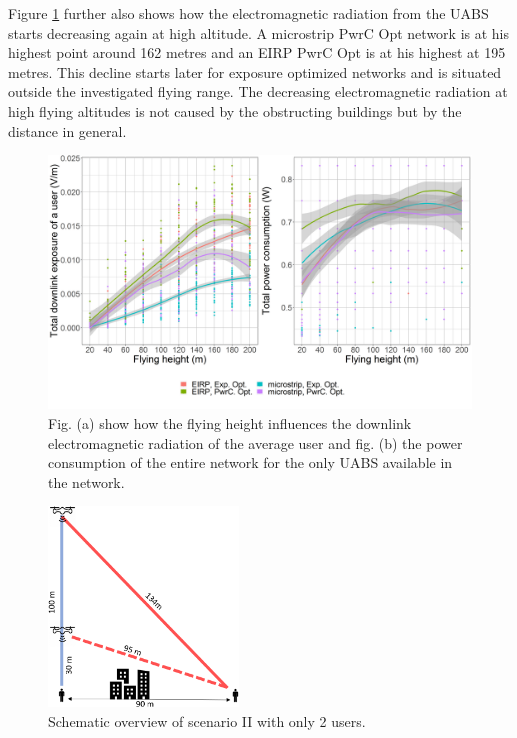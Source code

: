 Figure \ref{fig:s2a_dlAndPc} further also shows how the electromagnetic radiation from the \gls{UABS}
starts  decreasing again at high altitude. A microstrip \gls{PwrC Opt} network is at his highest point  
around 162 metres and an \gls{EIRP} \gls{PwrC Opt} is at his highest at 195 metres.
This decline starts later for exposure optimized networks and is situated outside the investigated flying range.
The decreasing electromagnetic radiation at high flying altitudes is not caused by the obstructing buildings but by the 
distance in general.


\begin{figure}[h!]
  \includegraphics[width=\textwidth]{../results/s2/fhvsdlAndPc.png}
  \caption{Fig. (a) show how the flying height influences the downlink electromagnetic radiation of the average user and fig. (b) the
  power consumption of the entire network for the only \acs{UABS} available in the network.}
  \label{fig:s2a_dlAndPc}
\end{figure}

\FloatBarrier
\begin{figure}
\vspace{-0.7cm}
  \begin{center}
    \includegraphics[width=0.45\textwidth]{../results/s2/proveScenario.png}
  \end{center}
  \caption{Schematic overview of scenario II with only 2 users.}
  \label{fig:schematicprove}
\end{figure}

